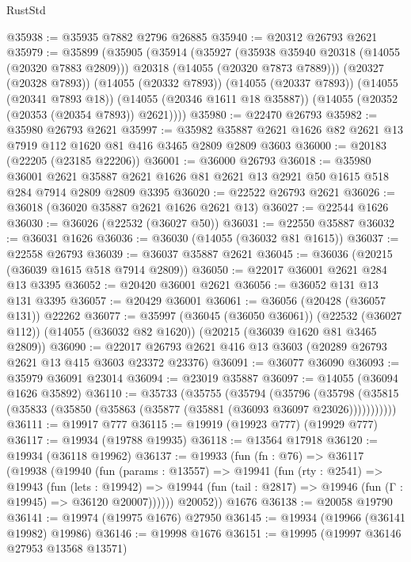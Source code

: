 \begin{lexlean}{RustStd}
\begin{coremodule}
@35938 := @35935 @7882 @2796 @26885
@35940 := @20312 @26793 @2621
@35979 := @35899
    (@35905
      (@35914
        (@35927
          (@35938 @35940 @20318 (@14055 (@20320 @7883 @2809)))
          @20318
          (@14055 (@20320 @7873 @7889)))
        (@20327 (@20328 @7893))
        (@14055 (@20332 @7893))
        (@14055 (@20337 @7893))
        (@14055 (@20341 @7893 @18))
        (@14055 (@20346 @1611 @18 @35887))
        (@14055 (@20352 (@20353 (@20354 @7893)) @2621))))
@35980 := @22470 @26793
@35982 := @35980 @26793 @2621
@35997 := @35982 @35887 @2621 @1626 @82 @2621 @13 @7919 @112 @1620 @81 @416 @3465 @2809 @2809 @3603
@36000 := @20183 (@22205 (@23185 @22206))
@36001 := @36000 @26793
@36018 := @35980
    @36001
    @2621
    @35887
    @2621
    @1626
    @81
    @2621
    @13
    @2921
    @50
    @1615
    @518
    @284
    @7914
    @2809
    @2809
    @3395
@36020 := @22522 @26793 @2621
@36026 := @36018 (@36020 @35887 @2621 @1626 @2621 @13)
@36027 := @22544 @1626
@36030 := @36026 (@22532 (@36027 @50))
@36031 := @22550 @35887
@36032 := @36031 @1626
@36036 := @36030 (@14055 (@36032 @81 @1615))
@36037 := @22558 @26793
@36039 := @36037 @35887 @2621
@36045 := @36036 (@20215 (@36039 @1615 @518 @7914 @2809))
@36050 := @22017 @36001 @2621 @284 @13 @3395
@36052 := @20420 @36001 @2621
@36056 := @36052 @131 @13 @131 @3395
@36057 := @20429 @36001
@36061 := @36056 (@20428 (@36057 @131)) @22262
@36077 := @35997
    (@36045 (@36050 @36061))
    (@22532 (@36027 @112))
    (@14055 (@36032 @82 @1620))
    (@20215 (@36039 @1620 @81 @3465 @2809))
@36090 := @22017 @26793 @2621 @416 @13 @3603 (@20289 @26793 @2621 @13 @415 @3603 @23372 @23376)
@36091 := @36077 @36090
@36093 := @35979 @36091 @23014
@36094 := @23019 @35887
@36097 := @14055 (@36094 @1626 @35892)
@36110 := @35733
    (@35755
      (@35794
        (@35796
          (@35798 (@35815 (@35833 (@35850 (@35863 (@35877 (@35881 (@36093 @36097 @23026)))))))))))
@36111 := @19917 @777
@36115 := @19919 (@19923 @777) (@19929 @777)
@36117 := @19934 (@19788 @19935)
@36118 := @13564 @17918
@36120 := @19934 (@36118 @19962)
@36137 := @19933
    (fun (fn : @76) =>
    @36117
      (@19938
        (@19940
          (fun (params : @13557) =>
          @19941
            (fun (rty : @2541) =>
            @19943
              (fun (lets : @19942) =>
              @19944 (fun (tail : @2817) => @19946 (fun (Γ : @19945) => @36120 @20007))))))
        @20052))
    @1676
@36138 := @20058 @19790
@36141 := @19974 (@19975 @1676) @27950
@36145 := @19934 (@19966 (@36141 @19982) @19986)
@36146 := @19998 @1676
@36151 := @19995 (@19997 @36146 @27953 @13568 @13571)

\end{coremodule}
\end{lexlean}

